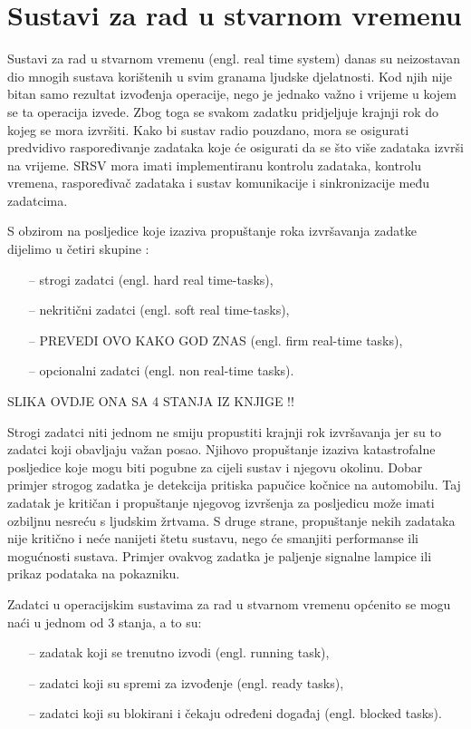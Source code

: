 \documentclass[../zavrsni.tex]{subfiles}
\begin{document}
\section{Sustavi za rad u stvarnom vremenu}

Sustavi za rad u stvarnom vremenu (engl. real time system) danas su neizostavan dio mnogih sustava korištenih u svim
granama ljudske djelatnosti. Kod njih nije bitan samo rezultat izvođenja operacije, nego je jednako važno 
i vrijeme u kojem se ta operacija izvede. Zbog toga se svakom zadatku pridjeljuje krajnji rok do kojeg se mora izvršiti. 
Kako bi sustav radio pouzdano, mora se osigurati predvidivo raspoređivanje zadataka koje će osigurati da se što više 
zadataka izvrši na vrijeme.
SRSV mora imati implementiranu kontrolu zadataka, kontrolu vremena, raspoređivač zadataka i sustav komunikacije i sinkronizacije
među zadatcima.

S obzirom na posljedice koje izaziva propuštanje roka izvršavanja zadatke dijelimo u četiri skupine :
\begin{itemize}
    \item[--] strogi zadatci (engl. hard real time-tasks),
    \item[--] nekritični zadatci (engl. soft real time-tasks),
    \item[--] PREVEDI OVO KAKO GOD ZNAS (engl. firm real-time tasks),
    \item[--] opcionalni zadatci (engl. non real-time tasks).
\end{itemize}
SLIKA OVDJE ONA SA 4 STANJA IZ KNJIGE !!

Strogi zadatci niti jednom ne smiju propustiti krajnji rok izvršavanja jer su to zadatci koji obavljaju važan posao. Njihovo 
propuštanje izaziva katastrofalne posljedice koje mogu biti pogubne za cijeli sustav i njegovu okolinu. Dobar primjer strogog zadatka je detekcija 
pritiska papučice kočnice na automobilu. Taj zadatak je kritičan i propuštanje njegovog izvršenja za posljedicu može imati ozbiljnu
nesreću s ljudskim žrtvama. S druge strane, propuštanje nekih zadataka nije kritično i neće nanijeti štetu sustavu, nego će smanjiti
 performanse ili mogućnosti sustava. Primjer ovakvog zadatka je paljenje signalne lampice ili prikaz podataka na pokazniku.

Zadatci u operacijskim sustavima za rad u stvarnom vremenu općenito se mogu naći u jednom od 3 stanja, a to su:
\begin{itemize}
    \item[--] zadatak koji se trenutno izvodi (engl. running task),
    \item[--] zadatci koji su spremi za izvođenje (engl. ready tasks),
    \item[--] zadatci koji su blokirani i čekaju određeni događaj (engl. blocked tasks).
\end{itemize}
\end{document}
